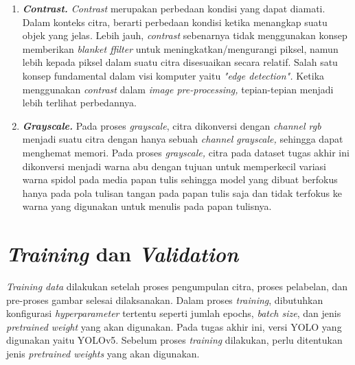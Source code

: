 \begin{enumerate}[nolistsep]
    \item \textit{\textbf{Contrast.} Contrast} merupakan perbedaan kondisi yang dapat diamati. Dalam konteks citra, berarti perbedaan kondisi ketika menangkap suatu objek yang jelas. Lebih jauh, \textit{contrast} sebenarnya tidak menggunakan konsep memberikan \textit{blanket ffilter} untuk meningkatkan/mengurangi piksel, namun lebih kepada piksel dalam suatu citra disesuaikan secara relatif. Salah satu konsep fundamental dalam visi komputer yaitu \textit{"edge detection".} Ketika menggunakan \textit{contrast} dalam \textit{image pre-processing,} tepian-tepian menjadi lebih terlihat perbedannya.
    \item \textit{\textbf{Grayscale.}} Pada proses \textit{grayscale}, citra dikonversi dengan \textit{channel rgb} menjadi suatu citra dengan hanya sebuah \textit{channel grayscale,} sehingga dapat menghemat memori. Pada proses \textit{grayscale,} citra pada dataset tugas akhir ini dikonversi menjadi warna abu dengan tujuan untuk memperkecil variasi warna spidol pada media papan tulis sehingga model yang dibuat berfokus hanya pada pola tulisan tangan pada papan tulis saja dan tidak terfokus ke warna yang digunakan untuk menulis pada papan tulisnya.
\end{enumerate}


\section{\textit{Training} dan \textit{Validation}}
\label{sec:trainvaldata}

\textit{Training data} dilakukan setelah proses pengumpulan citra, proses pelabelan, dan pre-proses gambar selesai dilaksanakan. Dalam proses \textit{training}, dibutuhkan konfigurasi \textit{hyperparameter} tertentu seperti jumlah epochs, \textit{batch size}, dan jenis \textit{pretrained weight} yang akan digunakan. Pada tugas akhir ini, versi YOLO yang digunakan yaitu YOLOv5. Sebelum proses \textit{training} dilakukan, perlu ditentukan jenis \textit{pretrained weights} yang akan digunakan. \par

